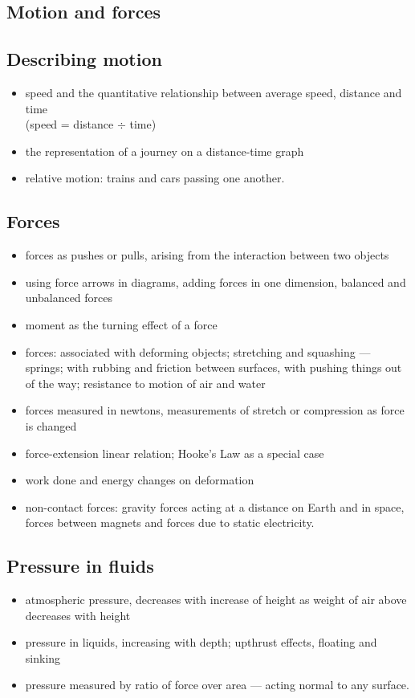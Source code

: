 \documentclass[10pt]{article}
\begin{document}
\begin{paracol}{2}
\switchcolumn*

\section{Motion and forces}
\subsection{Describing motion}
\begin{itemize}
\item speed and the quantitative relationship between average speed, distance and time\\
(speed = distance $\div$ time)
\item the representation of a journey on a distance-time graph
\item relative motion: trains and cars passing one another.
\end{itemize}

\subsection{Forces}
\begin{itemize}
\item forces as pushes or pulls, arising from the interaction between two objects
\item using force arrows in diagrams, adding forces in one dimension, balanced and
unbalanced forces
\item moment as the turning effect of a force
\item forces: associated with deforming objects; stretching and squashing --- springs; with
rubbing and friction between surfaces, with pushing things out of the way; resistance to
motion of air and water
\item forces measured in newtons, measurements of stretch or compression as force is
changed
\item force-extension linear relation; Hooke's Law as a special case
\item work done and energy changes on deformation
\item non-contact forces: gravity forces acting at a distance on Earth and in space, forces
between magnets and forces due to static electricity.
\end{itemize}

\subsection{Pressure in fluids}
\begin{itemize}
\item atmospheric pressure, decreases with increase of height as weight of air above
decreases with height
\item pressure in liquids, increasing with depth; upthrust effects, floating and sinking
\item pressure measured by ratio of force over area --- acting normal to any surface.
\end{itemize}


\end{paracol}
\end{document}
